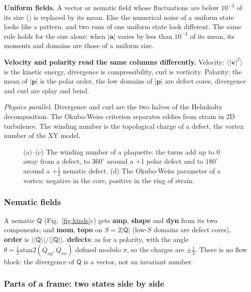 \documentclass[11pt,a4paper]{article}
\newcommand{\code}[1]{\texttt{\detokenize{#1}}}
\newcommand{\avg}[1]{\langle #1 \rangle}
\begin{document}
\begin{tech}
\textbf{Uniform fields.} A vector or nematic field whose fluctuations are below $10^{-3}$ of its size
(\code{FLAT_RELATIVE}) is replaced by its mean. Else the numerical noise of a uniform state looks like a
pattern, and two runs of one uniform state look different. The same rule holds for the size alone: when
$|\mathbf a|$ varies by less than $10^{-3}$ of its mean, its moments and domains are those of a uniform size.

\textbf{Velocity and polarity read the same columns differently.} Velocity: $\avg{|\mathbf v|^2}$ is the
kinetic energy, divergence is compressibility, curl is vorticity. Polarity: the mean of $|\mathbf p|$ is the
polar order, the low domains of $|\mathbf p|$ are defect cores, divergence and curl are splay and bend.

\emph{Physics parallel.} Divergence and curl are the two halves of the Helmholtz decomposition. The
Okubo-Weiss criterion separates eddies from strain in 2D turbulence. The winding number is the topological
charge of a defect, the vortex number of the XY model.
\end{tech}

\begin{figure}[H]
\centering

\caption{(a)--(c) The winding number of a plaquette: the turns add up to 0 away from a defect, to $360^\circ$
around a $+1$ polar defect and to $180^\circ$ around a $+\frac12$ nematic defect. (d) The Okubo-Weiss
parameter of a vortex: negative in the core, positive in the ring of strain.}\label{fig:winding}
\end{figure}

\subsubsection{Nematic fields}\label{sec:nematic}

\begin{tech}
A nematic $\mathsf Q$ (Fig.~\ref{fig:kinds}c) gets \textbf{amp}, \textbf{shape} and \textbf{dyn} from its two
components, and \textbf{mom}, \textbf{topo} on $S=2|\mathsf Q|$ (low-$S$ domains are defect cores).
\textbf{order} is $|\avg{\mathsf Q}|/\avg{|\mathsf Q|}$. \textbf{defects}: as for a polarity, with the angle
$\theta=\tfrac12\mathrm{atan2}(Q_{xy},Q_{xx})$ defined modulo $\pi$, so the charges are $\pm\frac12$. There is
no flow block: the divergence of $\mathsf Q$ is a vector, not an invariant number.
\end{tech}

\subsubsection{Parts of a frame: two states side by side}\label{sec:parts}
\end{document}
